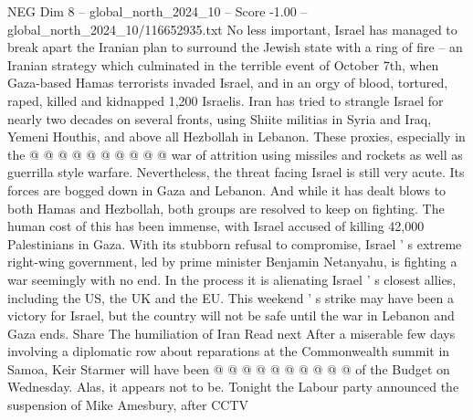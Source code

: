 \begin{textsample}{NEG Dim 8 – global\_north\_2024\_10 – Score -1.00 – global\_north\_2024\_10/116652935.txt}
No less important, Israel has managed to break apart the Iranian plan to surround the Jewish state with a ring of fire -- an Iranian strategy which culminated in the terrible event of October 7th, when Gaza-based Hamas terrorists invaded Israel, and in an orgy of blood, tortured, raped, killed and kidnapped 1,200 Israelis.
Iran has tried to strangle Israel for nearly two decades on several fronts, using Shiite militias in Syria and Iraq, Yemeni Houthis, and above all Hezbollah in Lebanon.
These proxies, especially in the @ @ @ @ @ @ @ @ @ @ war of attrition using missiles and rockets as well as guerrilla style warfare.
Nevertheless, the threat facing Israel is still very acute.
Its forces are bogged down in Gaza and Lebanon.
And while it has dealt blows to both Hamas and Hezbollah, both groups are resolved to keep on fighting.
The human cost of this has been immense, with Israel accused of killing 42,000 Palestinians in Gaza.
With its stubborn refusal to compromise, Israel ' s extreme right-wing government, led by prime minister Benjamin Netanyahu, is fighting a war seemingly with no end.
In the process it is alienating Israel ' s closest allies, including the US, the UK and the EU.
This weekend ' s strike may have been a victory for Israel, but the country will not be safe until the war in Lebanon and Gaza ends.
Share The humiliation of Iran Read next After a miserable few days involving a diplomatic row about reparations at the Commonwealth summit in Samoa, Keir Starmer will have been @ @ @ @ @ @ @ @ @ @ of the Budget on Wednesday.
Alas, it appears not to be.
Tonight the Labour party announced the suspension of Mike Amesbury, after CCTV

\end{textsample}
